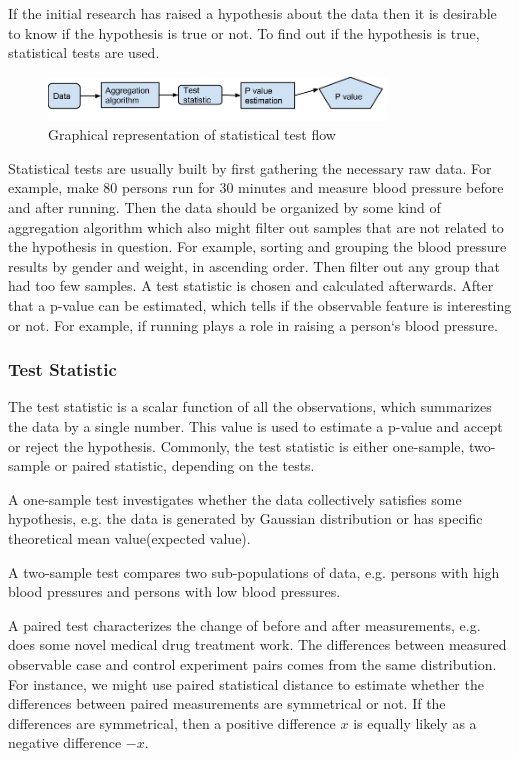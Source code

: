 \documentclass[12pt]{article}
\begin{document}
{If the initial research has raised a hypothesis about the data then it is desirable to know if the hypothesis is true or not. To find out if the hypothesis is true, statistical tests are used.

\begin{figure}[H]
  \centering
  \includegraphics[width=0.8\textwidth]{statisticalTestFlow}
  \caption{Graphical representation of statistical test flow}
  \label{fig:statisticalTestFlow}
\end{figure}

Statistical tests are usually built by first gathering the necessary raw data. For example, make 80 persons run for 30 minutes and measure blood pressure before and after running. Then the data should be organized by some kind of aggregation algorithm which also might filter out samples that are not related to the hypothesis in question. For example, sorting and grouping the blood pressure results by gender and weight, in ascending order. Then filter out any group that had too few samples. A test statistic is chosen and calculated afterwards. After that a p-value can be estimated, which tells if the observable feature is interesting or not. For example, if running plays a role in raising a person`s blood pressure.

\subsubsection{Test Statistic}

The test statistic is a scalar function of all the observations, which summarizes the data by a single number. This value is used to estimate a p-value and accept or reject the hypothesis. Commonly, the test statistic is either one-sample, two-sample or paired statistic, depending on the tests.

A one-sample test investigates whether the data collectively satisfies some hypothesis, e.g. the data is generated by Gaussian distribution or has specific theoretical mean value(expected value).

A two-sample test compares two sub-populations of data, e.g. persons with high blood pressures and persons with low blood pressures.

A paired test characterizes the change of before and after measurements, e.g. does some novel medical drug treatment work. The differences between measured observable case and control experiment pairs comes from the same distribution. For instance, we might use paired statistical distance to estimate whether the differences between paired measurements are symmetrical or not. If the differences are symmetrical, then a positive difference $x$ is equally likely as a negative difference $-x$.

}
\end{document}
